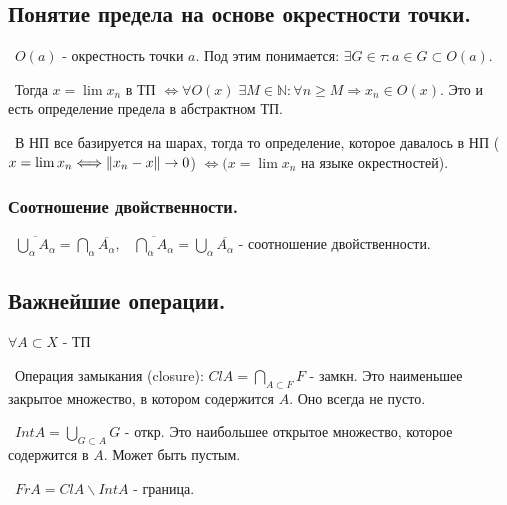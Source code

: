 \subsection*{Понятие предела на основе окрестности точки.}

\noindent \textasteriskcentered~$O(a)$ - окрестность точки $a$. Под этим понимается: $\exists G \in \tau : a \in G \subset O(a)$.

\smallskip
\noindent \textbullet~Тогда $x = \lim x_n$ в ТП $\Longleftrightarrow \forall O(x) \; \exists M \in \mathbb{N} : \forall n \ge M \Rightarrow x_n \in O(x)$. Это и есть определение предела в абстрактном ТП.

\medskip 
\noindent \textbullet~В НП все базируется на шарах, тогда то определение, которое давалось в НП ($x = \lim x_n \Longleftrightarrow \left\lVert x_n - x\right\rVert \to 0$) $\Longleftrightarrow (x = \lim x_n$ на языке окрестностей).

\subsubsection*{Соотношение двойственности.}

\noindent \textbullet~$\overline{\bigcup\limits_\alpha A_\alpha} = \bigcap\limits_\alpha \overline{A_\alpha}, \;\;\; \overline{\bigcap\limits_\alpha A_\alpha} = \bigcup\limits_\alpha \overline{A_\alpha}$ - соотношение двойственности.


\subsection*{Важнейшие операции.}

$\forall A \subset X$ - ТП

\noindent \textasteriskcentered~Операция замыкания (closure): $Cl A = \bigcap_{A \subset F} F$ - замкн. Это наименьшее закрытое множество, в котором содержится $A$. Оно всегда не пусто.

\noindent \textasteriskcentered~$Int A = \bigcup\limits_{G \subset A} G$ - откр. Это наибольшее открытое множество, которое содержится в $A$. Может быть пустым.

\noindent \textasteriskcentered~$Fr A = Cl A \backslash Int A$ - граница.

